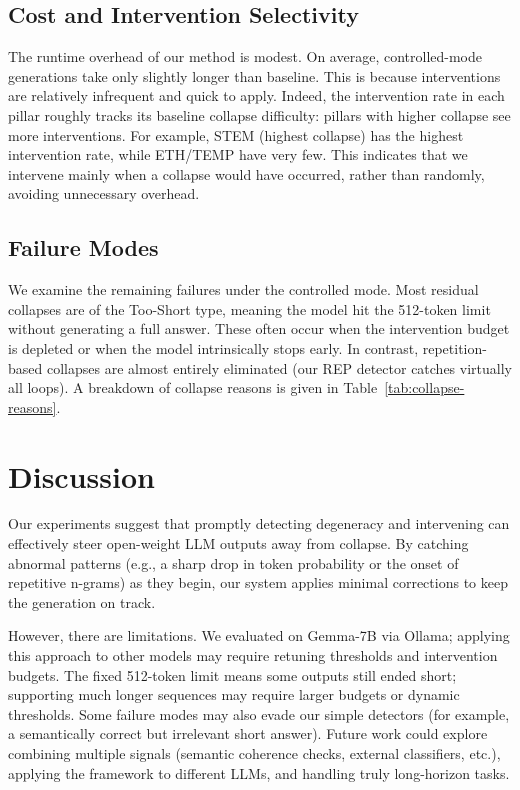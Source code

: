 \documentclass{article}
\begin{document}
\subsection{Cost and Intervention Selectivity}
The runtime overhead of our method is modest. On average, controlled-mode generations take only slightly longer than baseline. This is because interventions are relatively infrequent and quick to apply. Indeed, the intervention rate in each pillar roughly tracks its baseline collapse difficulty: pillars with higher collapse see more interventions. For example, STEM (highest collapse) has the highest intervention rate, while ETH/TEMP have very few. This indicates that we intervene mainly when a collapse would have occurred, rather than randomly, avoiding unnecessary overhead.

\subsection{Failure Modes}
We examine the remaining failures under the controlled mode. Most residual collapses are of the Too-Short type, meaning the model hit the 512-token limit without generating a full answer. These often occur when the intervention budget is depleted or when the model intrinsically stops early. In contrast, repetition-based collapses are almost entirely eliminated (our REP detector catches virtually all loops). A breakdown of collapse reasons is given in Table~\ref{tab:collapse-reasons}.

\section{Discussion}
Our experiments suggest that promptly detecting degeneracy and intervening can effectively steer open-weight LLM outputs away from collapse. By catching abnormal patterns (e.g., a sharp drop in token probability or the onset of repetitive n-grams) as they begin, our system applies minimal corrections to keep the generation on track.

However, there are limitations. We evaluated on Gemma-7B via Ollama; applying this approach to other models may require retuning thresholds and intervention budgets. The fixed 512-token limit means some outputs still ended short; supporting much longer sequences may require larger budgets or dynamic thresholds. Some failure modes may also evade our simple detectors (for example, a semantically correct but irrelevant short answer). Future work could explore combining multiple signals (semantic coherence checks, external classifiers, etc.), applying the framework to different LLMs, and handling truly long-horizon tasks.
\end{document}
